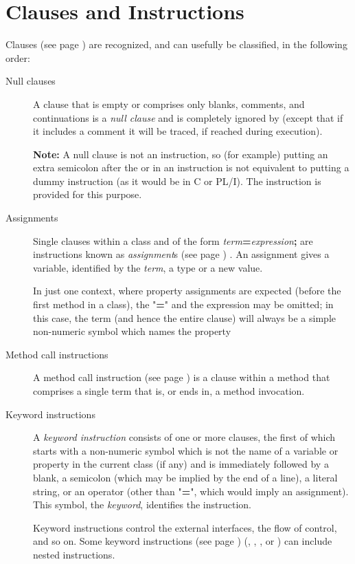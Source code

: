 \chapter{Clauses and Instructions}\label{refclause}
  Clauses (see page \pageref{refclau})  are recognized, and can usefully be
classified, in the following order:
\begin{description}
\item[Null clauses]\label{refnullcl}

A clause that is empty or comprises only blanks, comments, and
continuations is a \emph{null clause} and is completely ignored by
\nr{} (except that if it includes a comment it will be traced, if
reached during execution).
\begin{shaded}
\textbf{Note: }A null clause is not an instruction, so (for example) putting an
extra semicolon after the  or  in an
 instruction is not equivalent to putting a dummy instruction
(as it would be in C or PL/I).
The  instruction is provided for this purpose.
\end{shaded}
\item[Assignments]

Single clauses within a class and of the form
\emph{term}\textbf{=}\emph{expression}\textbf{;} are
instructions known as  \emph{assignment}s (see page \pageref{refassign}) .
An assignment gives a variable, identified by the
\emph{term}, a type or a new value.
 
In just one context, where property assignments are expected (before the
first method in a class), the "\textbf{=}" and the expression may
be omitted; in this case, the term (and hence the entire clause) will
always be a simple non-numeric symbol which names the property
\item[Method call instructions]\label{refxmeth}

A  method call instruction (see page \pageref{refmcalli})  is a clause within a
method that comprises a single term that is, or ends in, a method
invocation.
\item[Keyword instructions]\label{refkwcl}

A \emph{keyword instruction} consists of one or more clauses,
the first of which starts with a non-numeric symbol which is not the
name of a variable or property in the current class (if any) and is
immediately followed by a blank, a semicolon (which may be implied by
the end of a line), a literal string, or an operator (other than
"\textbf{=}", which would imply an assignment).
This symbol, the \emph{keyword}, identifies the instruction.
 
Keyword instructions control the external interfaces, the flow of
control, and so on.
Some  keyword instructions (see page \pageref{refkinst})  (, ,
, or ) can include nested instructions.
\end{description}
